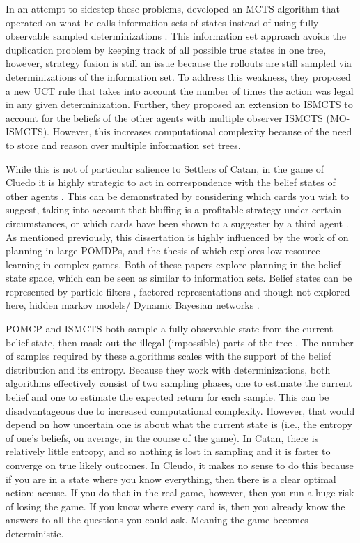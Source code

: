 \documentclass[msc, ai, logo, twoside, notimes, parskip, leftchapter, normalheadings]{infthesis}
\begin{document}
In an attempt to sidestep these problems, \citep{Cowling} developed an MCTS algorithm that operated on what he calls information sets of states instead of using fully-observable sampled determinizations \citep{Cowling}. This information set approach avoids the duplication problem by keeping track of all possible true states in one tree, however, strategy fusion is still an issue because the rollouts are still sampled via determinizations of the information set. To address this weakness, they proposed a new UCT rule that takes into account the number of times the action was legal in any given determinization. Further, they proposed an extension to ISMCTS to account for the beliefs of the other agents with multiple observer ISMCTS (MO-ISMCTS). However, this increases computational complexity because of the need to store and reason over multiple information set trees. 

While this is not of particular salience to Settlers of Catan, in the game of Cluedo it is highly strategic to act in correspondence with the belief states of other agents \citep{Mihai}. This can be demonstrated by considering which cards you wish to suggest, taking into account that bluffing is a profitable strategy under certain circumstances, or which cards have been shown to a suggester by a third agent \citep{IPP}. As mentioned previously, this dissertation is highly influenced by the work of \citep{Silver-veness} on planning in large POMDPs, and the thesis of \citep{Mihai} which explores low-resource learning in complex games. Both of these papers explore planning in the belief state space, which can be seen as similar to information sets. Belief states can be represented by particle filters \citep{Silver-veness}, factored representations \citep{Mihai} and though not explored here, hidden markov models/ Dynamic Bayesian networks \citep{Russell-norvig}. 

POMCP and ISMCTS both sample a fully observable state from the current belief state, then mask out the illegal (impossible) parts of the tree \citep{Mihai}. The number of samples required by these algorithms scales with the support of the belief distribution and its entropy. Because they work with determinizations, both algorithms effectively consist of two sampling phases, one to estimate the current belief and one to estimate the expected return for each sample. This can be disadvantageous due to increased computational complexity. However, that would depend on how uncertain one is about what the current state is (i.e., the entropy of one's beliefs, on average, in the course of the game). In Catan, there is relatively little entropy, and so nothing is lost in sampling and it is faster to converge on true likely outcomes. In Cleudo, it makes no sense to do this because if you are in a state where you know everything, then there is a clear optimal action: accuse. If you do that in the real game, however, then you run a huge risk of losing the game. If you know where every card is, then you already know the answers to all the questions you could ask. Meaning the game becomes deterministic. 
\end{document}
